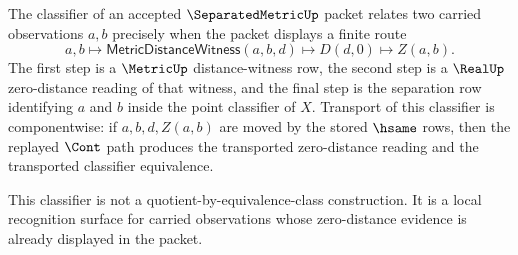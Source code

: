 \begin{definition}\label{def:separatedmetric-classifier}
The classifier of an accepted $\SeparatedMetricUp$ packet relates two carried observations $a,b$ precisely when the packet displays a finite route
$$
a,b\longmapsto \mathsf{MetricDistanceWitness}(a,b,d)\longmapsto D(d,0)\longmapsto Z(a,b).
$$
The first step is a $\MetricUp$ distance-witness row, the second step is a $\RealUp$ zero-distance reading of that witness, and the final step is the separation row identifying $a$ and $b$ inside the point classifier of $X$. Transport of this classifier is componentwise: if $a,b,d,Z(a,b)$ are moved by the stored $\hsame$ rows, then the replayed $\Cont$ path produces the transported zero-distance reading and the transported classifier equivalence.

This classifier is not a quotient-by-equivalence-class construction. It is a local recognition surface for carried observations whose zero-distance evidence is already displayed in the packet.
\end{definition}

